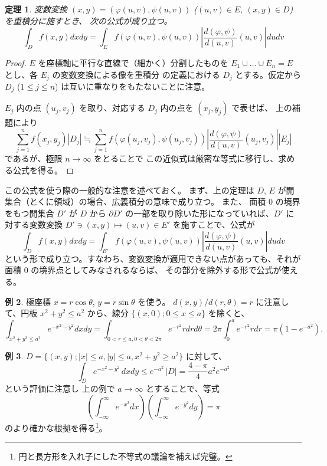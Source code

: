 \documentclass[a4paper]{jsarticle}
\newtheorem{Theorem}{定理}[section]
\theoremstyle{definition}
\newtheorem{Example}[Theorem]{例}
\theoremstyle{remark}
\begin{document}
\begin{Theorem}
変数変換 $(x,y) = (\varphi(u,v),\psi(u,v))$ {\rm($(u,v) \in E$, $(x,y) \in D$)} を重積分に施すとき、
次の公式が成り立つ。
\[
\int_D f(x,y)dxdy = \int_E f(\varphi(u,v),\psi(u,v))
\left|
\frac{d(\varphi,\psi)}{d(u,v)}(u,v)
\right|
dudv
\]
\end{Theorem}

\begin{proof}
$E$ を座標軸に平行な直線で（細かく）分割したものを
$E_1\cup\dots\cup E_n = E$ とし、各 $E_j$ の変数変換による像を重積分
の定義における $D_j$ とする。仮定から $D_j$ ($1 \leq j \leq n$) は互いに重なりをもたないことに注意。

$E_j$ 内の点 $(u_j,v_j)$ を取り、対応する $D_j$ 内の点を $(x_j,y_j)$ で表せば、
上の補題により
\[
\sum_{j=1}^n f(x_j,y_j) |D_j| 
\fallingdotseq 
\sum_{j=1}^n f(\varphi(u_j,v_j),\psi(u_j,v_j))
\left|
\frac{d(\varphi,\psi)}{d(u,v)}(u_j,v_j)
\right|
|E_j|
\]
であるが、極限 $n \to \infty$ をとることで この近似式は厳密な等式に移行し、求める公式を得る。
\end{proof}

この公式を使う際の一般的な注意を述べておく。
まず、上の定理は $D$, $E$ が開集合（とくに領域）の場合、広義積分の意味で成り立つ。
また、
面積 $0$ の境界をもつ開集合 $D'$ が $D$ から $\partial D'$ の一部を取り除いた形になっていれば、$D'$ に対する変数変換
$D' \ni (x,y) \mapsto (u,v) \in E'$ を施すことで、公式が
\[
 \int_D f(x,y)dxdy = \int_{E'} f(\varphi(u,v),\psi(u,v))
\left|
\frac{d(\varphi,\psi)}{d(u,v)}(u,v)
\right|
dudv
\]
という形で成り立つ。すなわち、変数変換が適用できない点があっても、それが面積 $0$ の境界点としてみなされるならば、
その部分を除外する形で公式が使える。


\begin{Example}
極座標 $x = r\cos\theta$, $y = r\sin\theta$ を使う。
$d(x,y)/d(r,\theta) = r$ に注意して、円板 $x^2+y^2 \leq a^2$ から、線分 $\{ (x,0); 0 \leq x \leq a\}$ を除くと、
\[
\int_{x^2+y^2\leq a^2} e^{-x^2-y^2} dxdy 
= \int_{0< r \leq a, 0 < \theta < 2\pi} e^{-r^2}rdrd\theta
= 2\pi \int_0^a e^{-r^2}rdr
= \pi(1-e^{-a^2}).
\]
\end{Example}

\begin{Example}
$D = \{(x,y); |x| \leq a, |y| \leq a, x^2+y^2 \geq a^2 \}$ に対して、
\[
\int_D e^{-x^2-y^2}\, dxdy 
\leq e^{-a^2}\, |D| = \frac{4-\pi}{4} a^2 e^{-a^2}
\]
という評価に注意し
上の例で $a \to \infty$ とすることで、等式
\[
\left(
\int_{-\infty}^{\infty} e^{-x^2} dx
\right)
\left(
\int_{-\infty}^{\infty} e^{-y^2} dy
\right)
= \pi
\]
のより確かな根拠を得る\footnote{円と長方形を入れ子にした不等式の議論を補えば完璧。}。
\end{Example}
\end{document}
